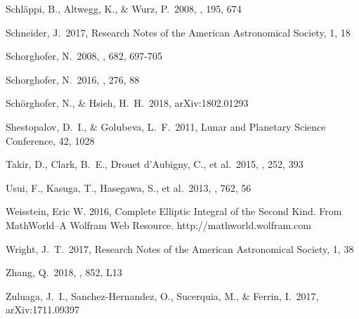 \documentclass[a4paper,fleqn,usenatbib]{mnras}
\begin{document}
\begin{thebibliography}{99}
 Schl{\"a}ppi, B., Altwegg, K., \& Wurz, P.\ 2008, \icarus, 195, 674 

 Schneider, J.\ 2017, Research Notes of the American Astronomical Society, 1, 18

 Schorghofer, N.\ 2008, \apj, 682, 697-705 

 Schorghofer, N.\ 2016, \icarus, 276, 88

 Sch{\"o}rghofer, N., \& Hsieh, H.~H.\ 2018, arXiv:1802.01293

 Shestopalov, D.~I., \& Golubeva, L.~F.\ 2011, Lunar and Planetary Science Conference, 42, 1028

 Takir, D., Clark, B.~E., Drouet d'Aubigny, C., et al.\ 2015, \icarus, 252, 393 

 Usui, F., Kasuga, T., Hasegawa, S., et al.\ 2013, \apj, 762, 56 

 Weisstein, Eric W. 2016, Complete Elliptic Integral of the Second Kind. From MathWorld--A Wolfram Web Resource. http://mathworld.wolfram.com

 Wright, J.~T.\ 2017, Research Notes of the American Astronomical Society, 1, 38 

 Zhang, Q.\ 2018, \apjl, 852, L13

 Zuluaga, J.~I., Sanchez-Hernandez, O., Sucerquia, M., \& Ferrin, I.\ 2017, arXiv:1711.09397

\end{thebibliography}


\bsp	%
\label{lastpage}
\end{document}
